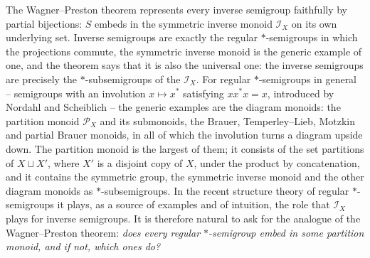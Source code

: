 \documentclass[11pt]{amsart}
\theoremstyle{definition}
\renewcommand{\P}{\mathcal{P}}      %
\begin{document}
The Wagner--Preston theorem represents every inverse semigroup faithfully by partial bijections: $S$ embeds in the symmetric inverse monoid $\mathcal I_X$ on its own underlying set. Inverse semigroups are exactly the regular $*$-semigroups in which the projections commute, the symmetric inverse monoid is the generic example of one, and the theorem says that it is also the universal one: the inverse semigroups are precisely the $*$-subsemigroups of the $\mathcal I_X$. For regular $*$-semigroups in general -- semigroups with an involution $x\mapsto x^*$ satisfying $xx^*x=x$, introduced by Nordahl and Scheiblich \cite{NS} -- the generic examples are the diagram monoids: the partition monoid $\P_X$ and its submonoids, the Brauer, Temperley--Lieb, Motzkin and partial Brauer monoids, in all of which the involution turns a diagram upside down. The partition monoid is the largest of them; it consists of the set partitions of $X\sqcup X'$, where $X'$ is a disjoint copy of $X$, under the product by concatenation, and it contains the symmetric group, the symmetric inverse monoid and the other diagram monoids as $*$-subsemigroups. In the recent structure theory of regular $*$-semigroups \cite{EM,EGMR} it plays, as a source of examples and of intuition, the role that $\mathcal I_X$ plays for inverse semigroups. It is therefore natural to ask for the analogue of the Wagner--Preston theorem: \emph{does every regular $*$-semigroup embed in some partition monoid, and if not, which ones do?}
\end{document}
